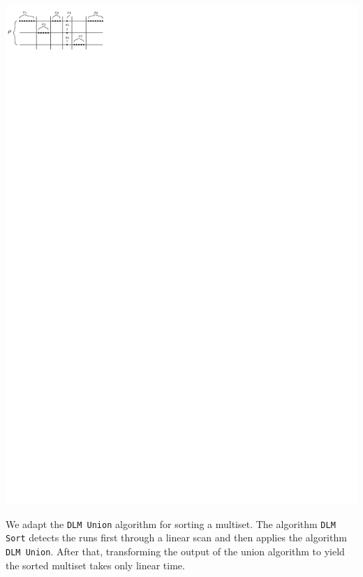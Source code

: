 \begin{minipage}[c]{.45\textwidth}
  \centering
  \includegraphics[scale=1.2]{union_instance1}
\end{minipage}\hfill
\begin{minipage}[c]{.45\textwidth}
  \label{fig:instance}
\end{minipage}

We adapt the \texttt{DLM Union} algorithm for sorting a multiset.  The
algorithm \texttt{DLM Sort} detects the runs first through a linear
scan and then applies the algorithm \texttt{DLM Union}. After that,
transforming the output of the union algorithm to yield the sorted
multiset takes only linear time.

